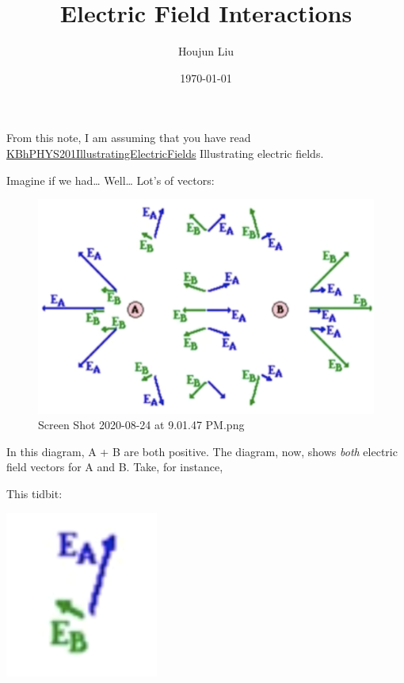 \documentclass[letterpaper]{article}
\author{Houjun Liu}
\date{\today}
\title{Electric Field Interactions}
\renewcommand{\tableofcontents}{}
\begin{document}
\tableofcontents

From this note, I am assuming that you have read
\href{KBhPHYS201IllustratingElectricFields.org}{KBhPHYS201IllustratingElectricFields}
Illustrating electric fields.

Imagine if we had\ldots{} Well\ldots{} Lot's of vectors:

\begin{figure}[htbp]
\centering
\includegraphics[width=.9\linewidth]{./Screen Shot 2020-08-24 at 9.01.47 PM.png}
\caption{Screen Shot 2020-08-24 at 9.01.47 PM.png}
\end{figure}

In this diagram, A + B are both positive. The diagram, now, shows \emph{both}
electric field vectors for A and B. Take, for instance,

This tidbit: \begin{center}
\includegraphics[width=.9\linewidth]{./Screen Shot 2020-08-24 at 9.04.52 PM.png}
\end{center}
\end{document}
